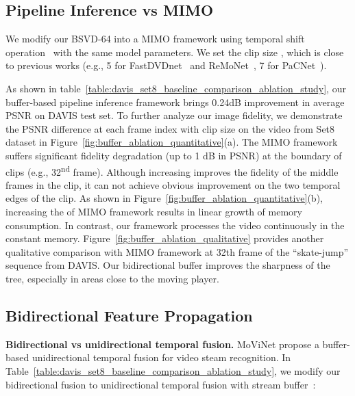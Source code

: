 \documentclass[sigconf]{acmart}
\newcommand{\ts}{\textsuperscript}
\begin{document}
\subsection{Pipeline Inference vs MIMO}
\label{section:Streaming inference vs parallel inference}
We modify our BSVD-64 into a MIMO framework using temporal shift operation~\cite{Lin2019TSM} with the same model parameters. We set the clip size , which is close to previous works (e.g., 5 for FastDVDnet~\cite{Tassano2020FastDVDNet} and ReMoNet~\cite{Xiang2022ReMoNet}, 7 for PaCNet~\cite{Vaksman2021Patch}). 

As shown in table~\ref{table:davis_set8_baseline_comparison_ablation_study}, our buffer-based pipeline inference framework brings 0.24dB improvement in average PSNR on DAVIS test set. 
To further analyze our image fidelity, we demonstrate the PSNR difference at each frame index
with clip size  on the video  from Set8 dataset in Figure~\ref{fig:buffer_ablation_quantitative}(a). The MIMO framework suffers significant fidelity degradation (up to 1 dB in PSNR) at the boundary of clips (e.g., 32\ts{nd} frame). Although increasing  improves the fidelity of the middle frames in the clip, it can not achieve obvious improvement on the two temporal edges of the clip.
As shown in Figure~\ref{fig:buffer_ablation_quantitative}(b), increasing the  of MIMO framework results in linear growth of memory consumption.
In contrast, our framework processes the video continuously in the constant memory. 
Figure~\ref{fig:buffer_ablation_qualitative} provides another qualitative comparison with  MIMO framework at 32th frame of the ``skate-jump'' sequence from DAVIS. Our bidirectional buffer improves the sharpness of the tree, especially in areas close to the moving player.














\subsection{Bidirectional Feature Propagation}
\label{section:Bidirectional_feature_propagation}
\textbf{Bidirectional vs unidirectional temporal fusion. }
MoViNet \cite{Kondratyuk2021movinets} propose a buffer-based unidirectional temporal fusion for video steam recognition. 
 In Table~\ref{table:davis_set8_baseline_comparison_ablation_study}, we modify our bidirectional fusion to unidirectional temporal fusion with stream buffer~\cite{Kondratyuk2021movinets}:
\end{document}
